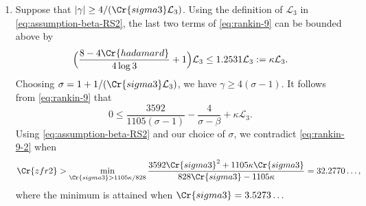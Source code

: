 \documentclass[12pt,reqno]{amsart}
\renewcommand{\tilde}{\widetilde}
\theoremstyle{remark}
\renewcommand{\tilde}{\widetilde}
\renewcommand{\tilde}{\widetilde}
\numberwithin{equation}{section}
\begin{document}
    \begin{enumerate}[ leftmargin=1cm]
        \item\label{thm3-case2.1}  Suppose that
        $|\gamma| \ge {4}/({\Cr{sigma3}\mathcal{L}_3})$. %
        Using the definition of $\mathcal{L}_3$ in \eqref{eq:assumption-beta-RS2}, the last two terms of \eqref{eq:rankin-9} can be bounded above by
    \[
    \Big(\frac{8-4\Cr{hadamard}}{4\log 3} + 1 \Big) \mathcal{L}_3 \le 1.2531\mathcal{L}_3 := \kappa\mathcal{L}_3. %
    \]
    Choosing $\sigma = 1 + {1}/({\Cr{sigma3}\mathcal{L}_3})$, we have $\gamma \ge 4(\sigma-1)$. It follows from \eqref{eq:rankin-9} that
    \begin{equation}\label{eq:rankin-9-2}
        0 \le \frac{3592}{1105(\sigma-1)} -\frac{4}{\sigma-\beta}
        +  \kappa\mathcal{L}_3.
    \end{equation}
    Using \eqref{eq:assumption-beta-RS2} and our choice of $\sigma$, we contradict \eqref{eq:rankin-9-2} when 
    \begin{equation}\label{eq:minimizer-rankin-2}
        \Cr{zfr2} >  \min_{\Cr{sigma3} > 1105\kappa/828} \frac{3592\Cr{sigma3}^2+1105\kappa\Cr{sigma3}}{828\Cr{sigma3}-1105\kappa} =  32.2770\ldots,
    \end{equation}
    where the minimum is attained when $\Cr{sigma3} = 3.5273\ldots$
    

\end{enumerate}
\end{document}
